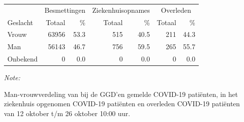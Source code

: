 \documentclass[
  english,
  man,floatsintext]{apa6}
\begin{document}
\begin{table}[H]
\centering\begingroup\fontsize{11}{13}\selectfont

\begin{threeparttable}
\begin{tabular}{lrrrrrr}
\toprule
\multicolumn{1}{c}{ } & \multicolumn{2}{c}{Besmettingen} & \multicolumn{2}{c}{Ziekenhuisopnames} & \multicolumn{2}{c}{Overleden} \\
\cmidrule(l{3pt}r{3pt}){2-3} \cmidrule(l{3pt}r{3pt}){4-5} \cmidrule(l{3pt}r{3pt}){6-7}
Geslacht & Totaal & \% & Totaal & \% & Totaal & \%\\
\midrule
Vrouw & 63956 & 53.3 & 515 & 40.5 & 211 & 44.3\\
Man & 56143 & 46.7 & 756 & 59.5 & 265 & 55.7\\
Onbekend & 0 & 0.0 & 0 & 0.0 & 0 & 0.0\\
\bottomrule
\end{tabular}
\begin{tablenotes}
\item \textit{Note: } 
\item Man-vrouwverdeling van bij de GGD’en gemelde COVID-19 patiënten, in het ziekenhuis opgenomen COVID-19 patiënten en overleden COVID-19 patiënten van 12 oktober t/m 26 oktober 10:00 uur.
\end{tablenotes}
\end{threeparttable}
\endgroup{}
\end{table}
\newpage
\end{document}
